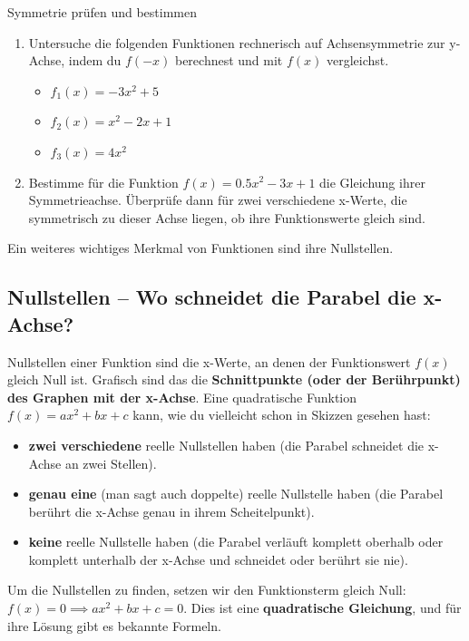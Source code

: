 \begin{aufgabenumgebung}{Symmetrie prüfen und bestimmen}
\begin{enumerate}
    \item Untersuche die folgenden Funktionen rechnerisch auf Achsensymmetrie zur y-Achse, indem du $f(-x)$ berechnest und mit $f(x)$ vergleichst.
        \begin{itemize}
            \item $f_1(x) = -3x^2 + 5$
            \item $f_2(x) = x^2 - 2x + 1$
            \item $f_3(x) = 4x^2$
        \end{itemize}
    \item Bestimme für die Funktion $f(x) = 0.5x^2 - 3x + 1$ die Gleichung ihrer Symmetrieachse. Überprüfe dann für zwei verschiedene x-Werte, die symmetrisch zu dieser Achse liegen, ob ihre Funktionswerte gleich sind.
\end{enumerate}
\end{aufgabenumgebung}

Ein weiteres wichtiges Merkmal von Funktionen sind ihre Nullstellen.

\subsection{Nullstellen – Wo schneidet die Parabel die x-Achse?}

Nullstellen einer Funktion sind die x-Werte, an denen der Funktionswert $f(x)$ gleich Null ist. Grafisch sind das die \textbf{Schnittpunkte (oder der Berührpunkt) des Graphen mit der x-Achse}.
Eine quadratische Funktion $f(x)=ax^2+bx+c$ kann, wie du vielleicht schon in Skizzen gesehen hast:
\begin{itemize}
    \item \textbf{zwei verschiedene} reelle Nullstellen haben (die Parabel schneidet die x-Achse an zwei Stellen).
    \item \textbf{genau eine} (man sagt auch doppelte) reelle Nullstelle haben (die Parabel berührt die x-Achse genau in ihrem Scheitelpunkt).
    \item \textbf{keine} reelle Nullstelle haben (die Parabel verläuft komplett oberhalb oder komplett unterhalb der x-Achse und schneidet oder berührt sie nie).
\end{itemize}

Um die Nullstellen zu finden, setzen wir den Funktionsterm gleich Null:
$f(x) = 0 \implies ax^2+bx+c=0$.
Dies ist eine \textbf{quadratische Gleichung}, und für ihre Lösung gibt es bekannte Formeln.

